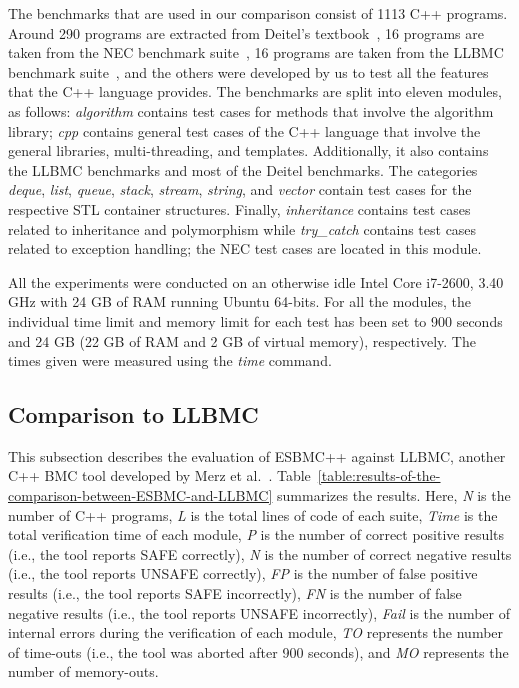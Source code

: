 \documentclass[conference]{IEEEtran}
\begin{document}
The benchmarks that are used in our comparison consist of 1113 C++ programs.
Around 290 programs are extracted from Deitel's textbook~\cite{Deitel},
16 programs are taken from the NEC benchmark suite~\cite{NeclabsBenchmarkExceptions},
16 programs are taken from the LLBMC benchmark suite~\cite{PrabhuMBIG11},
and the others were developed by us to test all the features that the C++ language
provides. The benchmarks are split into eleven modules, as follows:
\textit{algorithm} contains test cases for methods that involve the
algorithm library; \textit{cpp} contains general test cases of the C++
language that involve the general libraries, multi-threading, and templates.
Additionally, it also contains the LLBMC benchmarks and most of the Deitel
benchmarks. The categories \textit{deque}, \textit{list}, \textit{queue},
\textit{stack}, \textit{stream}, \textit{string}, and \textit{vector} contain test cases
for the respective STL container structures.
Finally, \textit{inheritance} contains test cases related to inheritance and
polymorphism while \textit{try\_catch} contains test cases related to exception handling;
the NEC test cases are located in this module.

All the experiments were conducted on an otherwise idle Intel Core i7-2600,
3.40 GHz with 24 GB of RAM running Ubuntu 64-bits. For all the modules,
the individual time limit and memory limit for each test has been set to 900 seconds
and 24 GB (22 GB of RAM and 2 GB of virtual memory), respectively.
The times given were measured using the \textit{time} command.

\subsection{Comparison to LLBMC}
\label{comparison-to-LLBMC}

This subsection describes the evaluation of ESBMC++
against LLBMC, another C++ BMC tool developed by Merz et al.~\cite{Florian12}.
Table~\ref{table:results-of-the-comparison-between-ESBMC-and-LLBMC}
summarizes the results. Here, \textit{N} is the number of C++ programs,
\textit{L} is the total lines of code of each suite, \textit{Time} is the
total verification time of each module, \textit{P} is the
number of correct positive results (i.e., the tool reports SAFE correctly),
\textit{N} is the number of correct negative results (i.e., the tool reports
UNSAFE correctly), \textit{FP} is the number of false positive
results (i.e., the tool reports SAFE incorrectly), \textit{FN} is the number
of false negative results (i.e., the tool reports UNSAFE incorrectly), \textit{Fail}
is the number of internal errors during the verification of each module,
\textit{TO} represents the number of time-outs (i.e., the tool was
aborted after 900 seconds),
and \textit{MO} represents the number of memory-outs.
\end{document}
